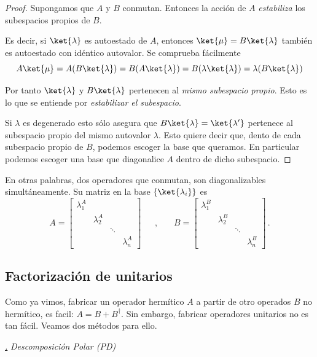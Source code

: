 \documentclass[a4paper,11pt]{book} %
\numberwithin{equation}{chapter}
\def\subsubiContadorIt{\par\addtocounter{subsubsection}{1}\underline{\it\thesubsubsection.}\hskip0.5cm \setcounter{subsubsubsectionIt}{0}}
\newcommand{\SubsubiIt}[1]{
		\subsubiContadorIt \textit{#1}
	}
\newcounter{subsubsubsectionIt}[subsubsection]
\begin{document}
	\begin{proof}
	Supongamos que $A$ y $B$ conmutan. Entonces la acción de $A$ \textit{estabiliza} los subespacios propios de $B$. 
\vspace{0.3cm}

Es decir, si $\ket{\lambda}$ es autoestado de $A$, entonces $\ket{\mu} = B\ket{\lambda}  $ también es autoestado con idéntico autovalor. Se comprueba fácilmente
$$
A \ket{\mu} = A(B\ket{\lambda} ) = B(A\ket{\lambda}) = B(\lambda\ket{\lambda}) = \lambda (B\ket{\lambda})
$$

Por tanto $\ket{\lambda}$ y $B\ket{\lambda}$ pertenecen al \textit{mismo subespacio propio}. Esto es lo que se entiende por \textit{estabilizar el subespacio}. 
\vspace{0.3cm}

Si $\lambda$ es degenerado esto sólo asegura que $B\ket{\lambda} = \ket{\lambda'}$ pertenece al subespacio propio del mismo autovalor $\lambda$. Esto quiere decir que, dento de cada subespacio propio de $B$, podemos escoger la base que queramos. En particular podemos escoger una base que diagonalice $A$ dentro de dicho subespacio.  
	\end{proof}

En otras palabras, dos operadores que conmutan, son diagonalizables simultáneamente. Su matriz en la base $\{\ket{\lambda_i}\}$ es
$$
A = \begin{bmatrix} \lambda^A_1 & & &  \\ & \lambda^A_2 & &   \\ & & \ddots &  \\ & & & \lambda^A_n 
\end{bmatrix}~~~~~~~,~~~~~~~~
B = \begin{bmatrix} \lambda^B_1 & & &  \\ & \lambda^B_2 & &   \\ & & \ddots &  \\ & & & \lambda^B_n 
\end{bmatrix}\, .
$$

		\subsection{Factorización de unitarios}
		
Como ya vimos, fabricar un operador hermítico $A$ a partir de otro operados $B$ no hermítico, es facil:
$A = B + B^\dagger$. Sin embargo, fabricar operadores unitarios no es tan fácil. Veamos dos métodos para ello.


			\SubsubiIt{Descomposición Polar (PD)}
\end{document}
